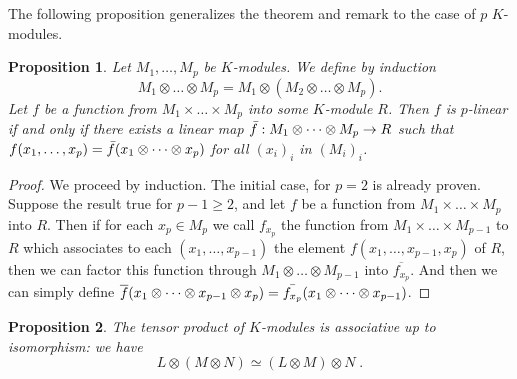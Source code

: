 \documentclass{report}
\newtheorem{prop}{Proposition}
\theoremstyle{definition}
\theoremstyle{remark}
\begin{document}
  The following proposition generalizes the theorem and remark to the case of $p$ $K$-modules.  
  
\begin{prop}\label{multitensorprod}
    Let $M_1,\dots,M_p$ be $K$-modules. We define by induction $$M_1 \otimes \dots \otimes M_p = M_1 \otimes (M_2 \otimes \dots \otimes M_p).$$
    Let $f$ be a function from $M_1 \times \dots \times M_p$ into some $K$-module $R$. Then $f$ is $p$-linear if and only if there exists a linear map $\Bar{f}: M_1 \otimes \dots \otimes M_p \to R$ such that $f(x_1,\dots,x_p) = \Bar{f}(x_1 \otimes \dots \otimes x_p)$ for all $(x_i)_i$ in $(M_i)_i$.
\end{prop}

\begin{proof}

We proceed by induction. The initial case, for $p=2$ is already proven. Suppose the result true for $p-1\geq 2$, and let $f$ be a function from $M_1 \times \dots \times M_p$ into $R$. Then if for each $x_p \in M_p$ we call $f_{x_p}$ the function from $M_1 \times \dots \times M_{p-1}$ to $R$ which associates to each $(x_1,\dots,x_{p-1})$ the element $f(x_1,\dots,x_{p-1},x_p)$ of $R$, then we can factor this function through $M_1 \otimes \dots \otimes M_{p-1}$ into $\overline{f_{x_p}}$. And then we can simply define $\overline{f}(x_1 \otimes \dots \otimes x_{p-1} \otimes x_p) = \Bar{f_{x_p}}(x_1 \otimes \dots \otimes x_{p-1})$. 

\end{proof}

\begin{prop} 
    The tensor product of $K$-modules is associative up to isomorphism: we have $$ L\otimes(M \otimes N) \simeq (L\otimes M) \otimes N \;. $$ 
\end{prop}  
\end{document}

